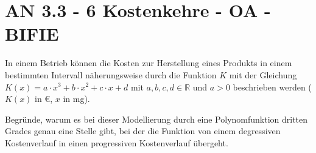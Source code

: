 \section{AN 3.3 - 6 Kostenkehre - OA - BIFIE}

\begin{beispiel}[AN 3.3]{1} %
In einem Betrieb können die Kosten zur Herstellung eines Produkts in einem bestimmten Intervall näherungsweise durch die Funktion $K$ mit der Gleichung \mbox{$K(x) = a \cdot x^3 + b\cdot x^2 + c \cdot x + d$}
mit $a, b, c, d \in \mathbb{R}$ und $a > 0$ beschrieben werden ($K(x)$ in \euro, $x$ in mg). \leer

Begründe, warum es bei dieser Modellierung durch eine Polynomfunktion dritten Grades genau eine Stelle gibt, bei der die Funktion von einem degressiven Kostenverlauf in einen progressiven Kostenverlauf übergeht.

\end{beispiel}